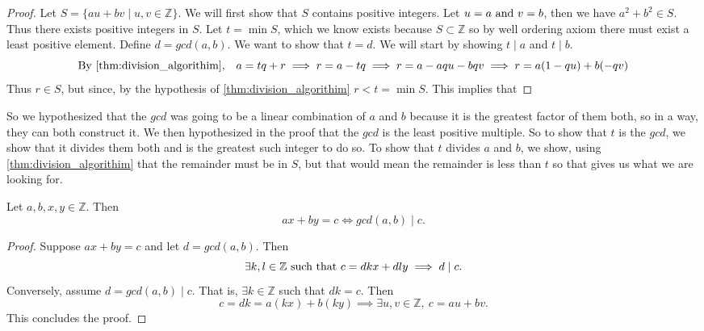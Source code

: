 \documentclass[../main.tex]{subfiles}
\begin{document}
\begin{proof}
Let \( S = \{au + bv \mid u,v \in \mathbb{Z}\}\). We will first show that \(S\) contains positive integers. Let \( u = a \textnormal{ and } v = b\), then we have \(a^2 + b^2 \in S\). Thus there exists positive integers in \(S\). Let \( t = \min S\), which we know exists because \(S \subset \mathbb{Z}\) so by well ordering axiom there must exist a least positive element. Define \(d = gcd(a,b) \). We want to show that \( t = d \). We will start by showing \( t \mid a\) and \(t \mid b\).
\[
\textnormal{By \ref{thm:division_algorithim},} \quad a = tq + r \implies r = a - tq \implies r = a - aqu - bqv \implies r = a(1-qu) + b(-qv)
\]
Thus \(r \in S\), but since, by the hypothesis of \ref{thm:division_algorithim} \quad \(r < t = \min S\). This implies that 

\end{proof}

\begin{remark}
So we hypothesized that the \(gcd\) was going to be a linear combination of \( a \) and \(b\)  because it is the greatest factor of them both, so in a way, they can both construct it. We then hypothesized in the proof that the \(gcd\) is the least positive multiple. So to show that \(t\) is the \(gcd\), we show that it divides them both and is the greatest such integer to do so. To show that \(t\) divides \( a \) and \(b\), we show, using \ref{thm:division_algorithim}  that the remainder must be in \(S\), but that would mean the remainder is less than \(t\) so that gives us what we are looking for. 
\end{remark}


\begin{proposition}\label{prp:gcd_divides_lin_combo}
Let \(a,b,x,y \in \mathbb{Z}\). Then 
\[
ax + by = c \iff gcd(a,b) \mid c.
\]
\end{proposition}

\begin{proof}
Suppose \(ax + by = c\) and let \(d = gcd(a,b)\). Then
\[
\exists k, l \in \mathbb{Z} \textnormal{ such that } c = dkx + dly \implies d \mid c. 
\]
Conversely, assume \(d = gcd(a,b) \mid c\). That is, \(\exists k \in \mathbb{Z}\) such that \(dk = c\). Then 
\[
c = dk = a(kx) + b(ky) \implies \exists u,v \in \mathbb{Z},\ c = au + bv.
\]
This concludes the proof.
\end{proof}
\end{document}
